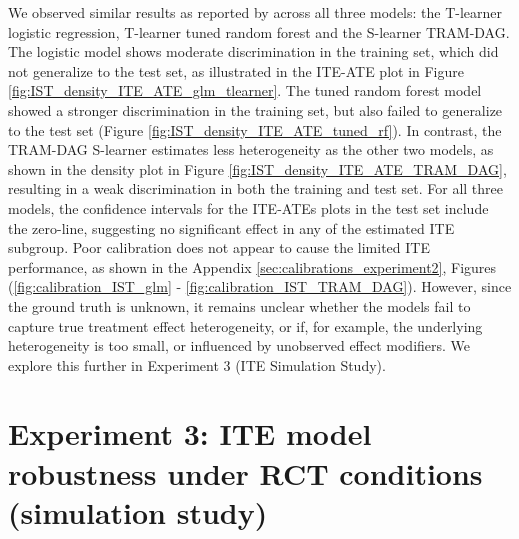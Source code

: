We observed similar results as reported by \citet{chen2025} across all three models: the T-learner logistic regression, T-learner tuned random forest and the S-learner TRAM-DAG. The logistic model shows moderate discrimination in the training set, which did not generalize to the test set, as illustrated in the ITE-ATE plot in Figure \ref{fig:IST_density_ITE_ATE_glm_tlearner}. The tuned random forest model showed a stronger discrimination in the training set, but also failed to generalize to the test set (Figure \ref{fig:IST_density_ITE_ATE_tuned_rf}). In contrast, the TRAM-DAG S-learner estimates less heterogeneity as the other two models, as shown in the density plot in Figure \ref{fig:IST_density_ITE_ATE_TRAM_DAG}, resulting in a weak discrimination in both the training and test set. For all three models, the confidence intervals for the ITE-ATEs plots in the test set include the zero-line, suggesting no significant effect in any of the estimated ITE subgroup. Poor calibration does not appear to cause the limited ITE performance, as shown in the Appendix \ref{sec:calibrations_experiment2}, Figures (\ref{fig:calibration_IST_glm} - \ref{fig:calibration_IST_TRAM_DAG}). However, since the ground truth is unknown, it remains unclear whether the models fail to capture true treatment effect heterogeneity, or if, for example, the underlying heterogeneity is too small, or influenced by unobserved effect modifiers. We explore this further in Experiment 3 (ITE Simulation Study).



\section{Experiment 3: ITE model robustness under RCT conditions (simulation study)}


